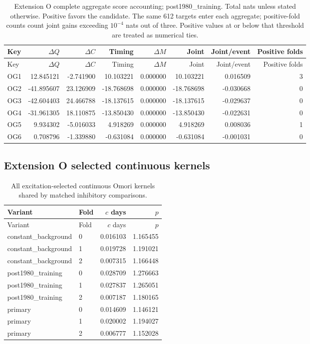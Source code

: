 {\small
\setlength{\tabcolsep}{3pt}
\begin{longtable}{lrrrrrrr}
\caption{Extension O complete aggregate score accounting; post1980\_training. Total nats unless stated otherwise. Positive favors the candidate. The same 612 targets enter each aggregate; positive-fold counts count joint gains exceeding $10^{-4}$ nats out of three. Positive values at or below that threshold are treated as numerical ties.}\label{tab:OG-post1980_training}\\
\toprule
Key & $\Delta Q$ & $\Delta C$ & Timing & $\Delta M$ & Joint & Joint/event & Positive folds\\\midrule
\endfirsthead
\toprule
Key & $\Delta Q$ & $\Delta C$ & Timing & $\Delta M$ & Joint & Joint/event & Positive folds\\\midrule
\endhead
OG1 & 12.845121 & -2.741900 & 10.103221 & 0.000000 & 10.103221 & 0.016509 & 3\\
OG2 & -41.895607 & 23.126909 & -18.768698 & 0.000000 & -18.768698 & -0.030668 & 0\\
OG3 & -42.604403 & 24.466788 & -18.137615 & 0.000000 & -18.137615 & -0.029637 & 0\\
OG4 & -31.961305 & 18.110875 & -13.850430 & 0.000000 & -13.850430 & -0.022631 & 0\\
OG5 & 9.934302 & -5.016033 & 4.918269 & 0.000000 & 4.918269 & 0.008036 & 1\\
OG6 & 0.708796 & -1.339880 & -0.631084 & 0.000000 & -0.631084 & -0.001031 & 0\\
\bottomrule
\end{longtable}
}

\subsection{Extension O selected continuous kernels}
\label{app:audit09-extension-o-kernels}
{\small
\setlength{\tabcolsep}{3pt}
\begin{longtable}{llrr}
\caption{All excitation-selected continuous Omori kernels shared by matched inhibitory comparisons.}\label{tab:o-kernels}\\
\toprule
Variant & Fold & $c$ days & $p$\\\midrule
\endfirsthead
\toprule
Variant & Fold & $c$ days & $p$\\\midrule
\endhead
constant\_background & 0 & 0.016103 & 1.165455\\
constant\_background & 1 & 0.019728 & 1.191021\\
constant\_background & 2 & 0.007315 & 1.166448\\
post1980\_training & 0 & 0.028709 & 1.276663\\
post1980\_training & 1 & 0.027837 & 1.265051\\
post1980\_training & 2 & 0.007187 & 1.180165\\
primary & 0 & 0.014609 & 1.146121\\
primary & 1 & 0.020002 & 1.194027\\
primary & 2 & 0.006777 & 1.152028\\
\bottomrule
\end{longtable}
}

